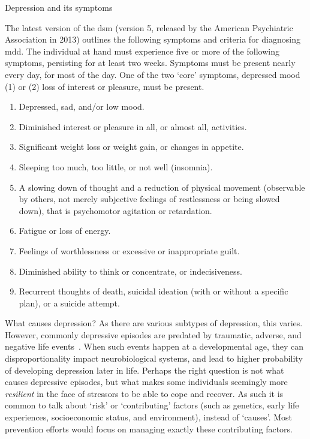 \begin{mybox}[floatplacement=t,fontupper=\footnotesize,fontlower=\footnotesize,label={box:depression},colback=White]{Depression and its symptoms}

  The latest version of the \gls{dsm} (version 5, released by the American Psychiatric Association in 2013) outlines the following symptoms and criteria for diagnosing \gls{mdd}.
  The individual at hand must experience five or more of the following symptoms, persisting for at least two weeks.
  Symptoms must be present nearly every day, for most of the day.
  One of the two `core' symptoms, depressed mood (1) or (2) loss of interest or pleasure, must be present.

  \tcblower

  \begin{enumerate}
    \item Depressed, sad, and/or low mood.
    \item Diminished interest or pleasure in all, or almost all, activities.
    \item Significant weight loss or weight gain, or changes in appetite.
    \item Sleeping too much, too little, or not well (insomnia).
    \item A slowing down of thought and a reduction of physical movement (observable by others, not merely subjective feelings of restlessness or being slowed down), that is psychomotor agitation or retardation.
    \item Fatigue or loss of energy.
    \item Feelings of worthlessness or excessive or inappropriate guilt.
    \item Diminished ability to think or concentrate, or indecisiveness.
    \item Recurrent thoughts of death, suicidal ideation (with or without a specific plan), or a suicide attempt.
  \end{enumerate}

\end{mybox}

What causes depression?
As there are various subtypes of depression, this varies.
However, commonly depressive episodes are predated by traumatic, adverse, and negative life events~\parencite{Kessler1997, Monroe2008}.
When such events happen at a developmental age, they can disproportionality impact neurobiological systems, and lead to higher probability of developing depression later in life.
Perhaps the right question is not what causes depressive episodes, but what makes some individuals seemingly more \emph{resilient} in the face of stressors to be able to cope and recover.
As such it is common to talk about `risk' or `contributing' factors (such as genetics, early life experiences, socioeconomic status, and environment), instead of `causes'.
Most prevention efforts would focus on managing exactly these contributing factors.

